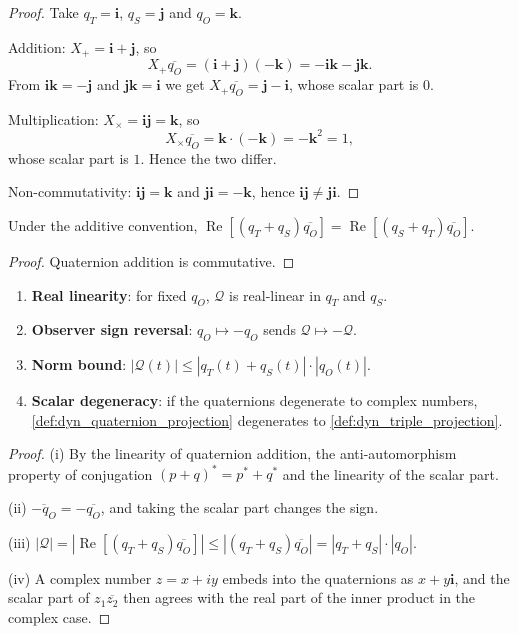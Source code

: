 \begin{proof}
Take $q_T=\mathbf i$, $q_S=\mathbf j$ and $q_O=\mathbf k$.

Addition: $X_+=\mathbf i+\mathbf j$, so
\[
X_+\overline{q_O}=(\mathbf i+\mathbf j)(-\mathbf k)=-\mathbf i\mathbf k-\mathbf j\mathbf k.
\]
From $\mathbf i\mathbf k=-\mathbf j$ and $\mathbf j\mathbf k=\mathbf i$ we get $X_+\overline{q_O}=\mathbf j-\mathbf i$, whose scalar part is $0$.

Multiplication: $X_\times=\mathbf i\mathbf j=\mathbf k$, so
\[
X_\times\overline{q_O}=\mathbf k\cdot(-\mathbf k)=-\mathbf k^2=1,
\]
whose scalar part is $1$. Hence the two differ.

Non-commutativity: $\mathbf i\mathbf j=\mathbf k$ and $\mathbf j\mathbf i=-\mathbf k$, hence $\mathbf i\mathbf j\neq\mathbf j\mathbf i$.
\end{proof}

\begin{corollary}\label{cor:dyn_quaternion_additive_commutative}
Under the additive convention, $\operatorname{Re}[(q_T+q_S)\overline{q_O}]=\operatorname{Re}[(q_S+q_T)\overline{q_O}]$.
\end{corollary}

\begin{proof}
Quaternion addition is commutative.
\end{proof}

\begin{property}\label{prop:dyn_quaternion_properties}
\begin{enumerate}[label=(\roman*)]
    \item \textbf{Real linearity}: for fixed $q_O$, $\mathcal Q$ is real-linear in $q_T$ and $q_S$.
    \item \textbf{Observer sign reversal}: $q_O\mapsto-q_O$ sends $\mathcal Q\mapsto-\mathcal Q$.
    \item \textbf{Norm bound}: $|\mathcal Q(t)|\le|q_T(t)+q_S(t)|\cdot|q_O(t)|$.
    \item \textbf{Scalar degeneracy}: if the quaternions degenerate to complex numbers, \cref{def:dyn_quaternion_projection} degenerates to \cref{def:dyn_triple_projection}.
\end{enumerate}
\end{property}

\begin{proof}
(i) By the linearity of quaternion addition, the anti-automorphism property of conjugation $(p+q)^* = p^*+q^*$ and the linearity of the scalar part.

(ii) $\overline{-q_O}=-\overline{q_O}$, and taking the scalar part changes the sign.

(iii) $|\mathcal Q|=|\operatorname{Re}[(q_T+q_S)\overline{q_O}]|\le|(q_T+q_S)\overline{q_O}|=|q_T+q_S|\cdot|q_O|$.

(iv) A complex number $z=x+iy$ embeds into the quaternions as $x+y\mathbf i$, and the scalar part of $z_1\overline{z_2}$ then agrees with the real part of the inner product in the complex case.
\end{proof}

